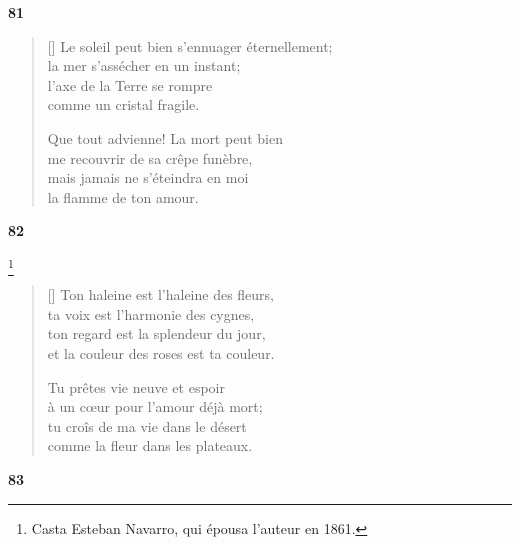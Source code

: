 \documentclass[a4paper,12pt]{book}
\begin{document}
\bigskip

\begin{center}
  \textbf{81}
\end{center}

\settowidth{\versewidth}{Le soleil peut bien s'ennuager éternellement;}


\begin{verse}[\versewidth]
  Le soleil peut bien s'ennuager éternellement; \\
  la mer s'assécher en un instant; \\
  l'axe de la Terre se rompre \\
  comme un cristal fragile.

  Que tout advienne! La mort peut bien \\
  me recouvrir de sa crêpe funèbre, \\
  mais jamais ne s'éteindra en moi \\
  la flamme de ton amour.
\end{verse}

\bigskip

\begin{center}
  \textbf{82}
\end{center}

\settowidth{\versewidth}{et la couleur des roses est ta couleur.}

\footnote{Casta Esteban Navarro, qui épousa
  l'auteur en 1861.}

\begin{verse}[\versewidth]
  Ton haleine est l'haleine des fleurs, \\
  ta voix est l'harmonie des cygnes, \\
  ton regard est la splendeur du jour, \\
  et la couleur des roses est ta couleur.

  Tu prêtes vie neuve et espoir \\
  à un cœur pour l'amour déjà mort; \\
  tu croîs de ma vie dans le désert \\
  comme la fleur dans les plateaux.
\end{verse}

\bigskip

\begin{center}
  \textbf{83}
\end{center}
\end{document}
